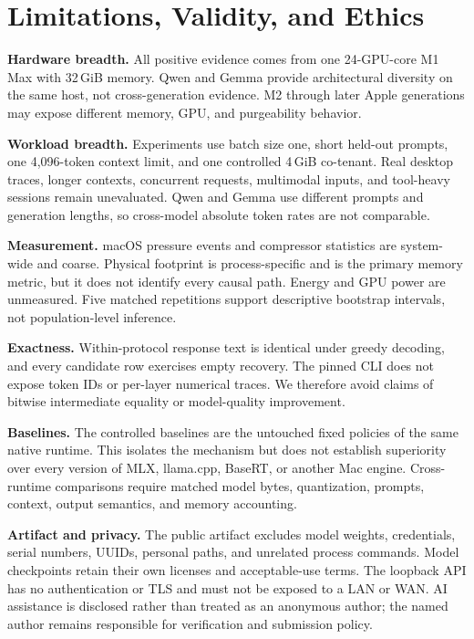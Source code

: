 \section{Limitations, Validity, and Ethics}
\label{sec:limitations}

\textbf{Hardware breadth.} All positive evidence comes from one 24-GPU-core M1
Max with 32\,GiB memory. Qwen and Gemma provide architectural diversity on the
same host, not cross-generation evidence. M2 through later Apple generations
may expose different memory, GPU, and purgeability behavior.

\textbf{Workload breadth.} Experiments use batch size one, short held-out
prompts, one 4,096-token context limit, and one controlled 4\,GiB co-tenant.
Real desktop traces, longer contexts, concurrent requests, multimodal inputs,
and tool-heavy sessions remain unevaluated. Qwen and Gemma use different prompts
and generation lengths, so cross-model absolute token rates are not comparable.

\textbf{Measurement.} macOS pressure events and compressor statistics are
system-wide and coarse. Physical footprint is process-specific and is the
primary memory metric, but it does not identify every causal path. Energy and
GPU power are unmeasured. Five matched repetitions support descriptive
bootstrap intervals, not population-level inference.

\textbf{Exactness.} Within-protocol response text is identical under greedy
decoding, and every candidate row exercises empty recovery. The pinned CLI does
not expose token IDs or per-layer numerical traces. We therefore avoid claims
of bitwise intermediate equality or model-quality improvement.

\textbf{Baselines.} The controlled baselines are the untouched fixed policies
of the same native runtime. This isolates the mechanism but does not establish
superiority over every version of MLX, llama.cpp, BaseRT, or another Mac engine.
Cross-runtime comparisons require matched model bytes, quantization, prompts,
context, output semantics, and memory accounting.

\textbf{Artifact and privacy.} The public artifact excludes model weights,
credentials, serial numbers, UUIDs, personal paths, and unrelated process
commands. Model checkpoints retain their own licenses and acceptable-use terms.
The loopback API has no authentication or TLS and must not be exposed to a LAN
or WAN. AI assistance is disclosed rather than treated as an anonymous author;
the named author remains responsible for verification and submission policy.
